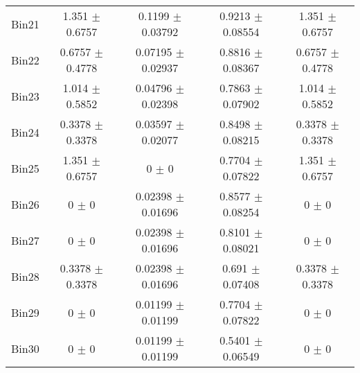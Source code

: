 \begin{tabular}{@{\extracolsep{4pt}}lcccc@{}}
     Bin21 & 1.351 $\pm$ 0.6757 & 0.1199 $\pm$ 0.03792 & 0.9213 $\pm$ 0.08554 & 1.351 $\pm$ 0.6757 \\ 
     Bin22 & 0.6757 $\pm$ 0.4778 & 0.07195 $\pm$ 0.02937 & 0.8816 $\pm$ 0.08367 & 0.6757 $\pm$ 0.4778 \\ 
     Bin23 & 1.014 $\pm$ 0.5852 & 0.04796 $\pm$ 0.02398 & 0.7863 $\pm$ 0.07902 & 1.014 $\pm$ 0.5852 \\ 
     Bin24 & 0.3378 $\pm$ 0.3378 & 0.03597 $\pm$ 0.02077 & 0.8498 $\pm$ 0.08215 & 0.3378 $\pm$ 0.3378 \\ 
     Bin25 & 1.351 $\pm$ 0.6757 & 0 $\pm$ 0 & 0.7704 $\pm$ 0.07822 & 1.351 $\pm$ 0.6757 \\ 
     Bin26 & 0 $\pm$ 0 & 0.02398 $\pm$ 0.01696 & 0.8577 $\pm$ 0.08254 & 0 $\pm$ 0 \\ 
     Bin27 & 0 $\pm$ 0 & 0.02398 $\pm$ 0.01696 & 0.8101 $\pm$ 0.08021 & 0 $\pm$ 0 \\ 
     Bin28 & 0.3378 $\pm$ 0.3378 & 0.02398 $\pm$ 0.01696 & 0.691 $\pm$ 0.07408 & 0.3378 $\pm$ 0.3378 \\ 
     Bin29 & 0 $\pm$ 0 & 0.01199 $\pm$ 0.01199 & 0.7704 $\pm$ 0.07822 & 0 $\pm$ 0 \\ 
     Bin30 & 0 $\pm$ 0 & 0.01199 $\pm$ 0.01199 & 0.5401 $\pm$ 0.06549 & 0 $\pm$ 0 \\ 
\hline\hline
  \end{tabular}
